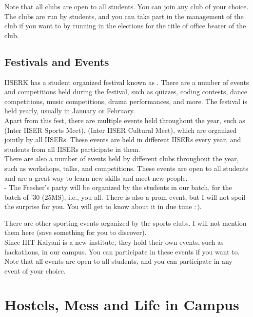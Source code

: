 \documentclass[openany]{book}
\begin{document}
\begin{mynote}
    Note that all clubs are open to all students. You can join any club of your choice. The clubs are run by students, and you can take part in the management of the club if you want to by running in the elections for the title of office bearer of the club. 
\end{mynote}
\subsection{Festivals and Events}
IISERK has a student organized festival known as . There are a number of events and competitions held during the festival, such as quizzes, coding contests, dance competitions, music competitions, drama performances, and more. The festival is held yearly, usually in January or February. \\
Apart from this fest, there are multiple events held throughout the year, such as  (Inter IISER Sports Meet),  (Inter IISER Cultural Meet), which are organized jointly by all IISERs. These events are held in different IISERs every year, and students from all IISERs participate in them. \\
There are also a number of events held by different clubs throughout the year, such as workshops, talks, and competitions. These events are open to all students and are a great way to learn new skills and meet new people. \\
 - The Fresher's party will be organized by the students in our batch, for the batch of '30 (25MS), i.e., you all. There is also a prom event, but I will not spoil the surprise for you. You will get to know about it in due time $:)$.
\begin{mynote}
    There are other sporting events organized by the sports clubs. I will not mention them here (save something for you to discover). \\
    Since IIIT Kalyani is a new institute, they hold their own events, such as hackathons, in our campus. You can participate in these events if you want to. \\
    Note that all events are open to all students, and you can participate in any event of your choice.
\end{mynote}
\section{Hostels, Mess and Life in Campus}
\end{document}

